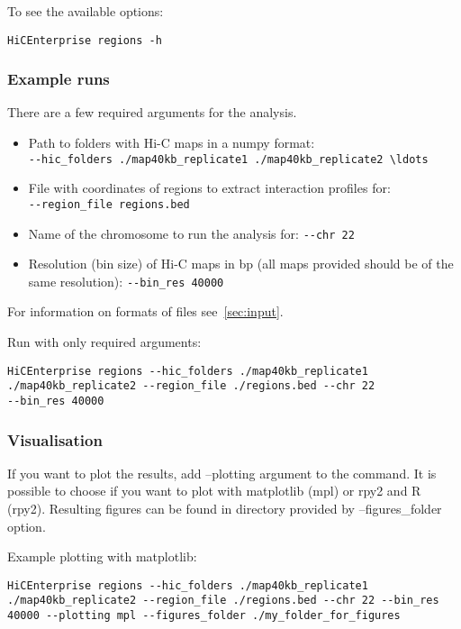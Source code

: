 To see the available options:
\begin{lstlisting}
HiCEnterprise regions -h
\end{lstlisting}

\subsubsection{Example runs}
There are a few required arguments for the analysis.
\begin{itemize}
    \item Path to folders with Hi-C maps in a numpy format: \\
\lstinline{--hic_folders ./map40kb_replicate1 ./map40kb_replicate2 \ldots}
    \item File with coordinates of regions to extract interaction profiles for: \\
\lstinline{--region_file regions.bed}
    \item Name of the chromosome to run the analysis for:  \lstinline{--chr 22}
    \item Resolution (bin size) of Hi-C maps in bp (all maps provided should be of the same resolution): \lstinline{--bin_res 40000}
\end{itemize}

For information on formats of files see~\ref{sec:input}.



Run with only required arguments:
\begin{lstlisting}
HiCEnterprise regions --hic_folders ./map40kb_replicate1 
./map40kb_replicate2 --region_file ./regions.bed --chr 22
--bin_res 40000
\end{lstlisting}

\subsubsection{Visualisation}

If you want to plot the results, add --plotting argument to the command. It is possible to choose if you want to plot
with matplotlib (mpl) or rpy2 and R (rpy2). Resulting figures can be found in directory provided by --figures\_folder
option.

Example plotting with matplotlib:
\begin{lstlisting}
HiCEnterprise regions --hic_folders ./map40kb_replicate1 
./map40kb_replicate2 --region_file ./regions.bed --chr 22 --bin_res
40000 --plotting mpl --figures_folder ./my_folder_for_figures
\end{lstlisting}

